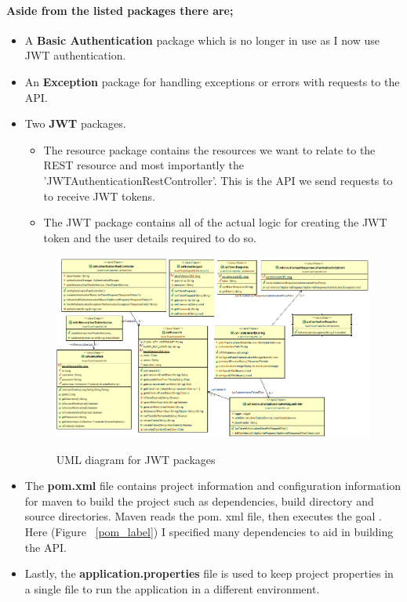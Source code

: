 \paragraph{Aside from the listed packages there are;}
\begin{itemize}
    \item A \textbf{Basic Authentication} package which is no longer in use as I now use JWT authentication.
    \item An \textbf{Exception} package for handling exceptions or errors with requests to the API.
    \item Two \textbf{JWT} packages.
        \begin{itemize}
            \item The resource package contains the resources we want to relate to the REST resource and most importantly the 'JWTAuthenticationRestController'. This is the API we send requests to to receive JWT tokens.
            \item The JWT package contains all of the actual logic for creating the JWT token and the user details required to do so.
        \end{itemize}
        \begin{figure}[ht]
        \centering
        \includegraphics[scale=0.4]{Images/JWT UML.png} 
        \label{jwtuml_label}
        \caption{UML diagram for JWT packages}
        \end{figure}
        \item The \textbf{pom.xml} file contains project information and configuration information for maven to build the project such as dependencies, build directory and source directories. Maven reads the pom. xml file, then executes the goal \cite{POM}. Here (Figure ~\ref{pom_label}) I specified many dependencies to aid in building the API.
        \item Lastly, the \textbf{application.properties} file is used to keep project properties in a single file to run the application in a different environment.
\end{itemize}

